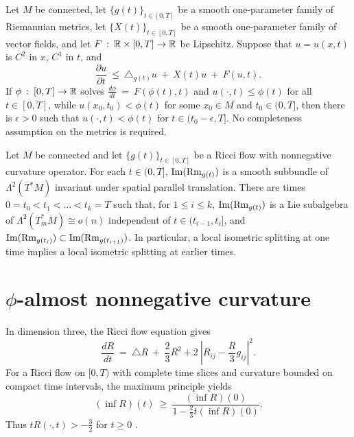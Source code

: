 \begin{theorem}
  \label{thm:kl-maximum-principles-existence-maximum-principles}

Let $M$ be connected, let $\{g(t)\}_{t\in[0,T]}$ be a smooth one-parameter
family of Riemannian metrics, let $\{X(t)\}_{t\in[0,T]}$ be a smooth
one-parameter family of vector fields, and let
$F\: : \:{\mathbb R}\times[0,T]\rightarrow{\mathbb R}$ be Lipschitz. Suppose that $u=u(x,t)$
is $C^2$ in $x$, $C^1$ in $t$, and
\begin{equation}
\frac{\partial u}{\partial t}\: \le \:\triangle_{g(t)}u\:+\:X(t)u\:+\:F(u,t).
\end{equation}
If $\phi\: : \:[0,T]\rightarrow{\mathbb R}$ solves
$\frac{d\phi}{dt}\:=\:F(\phi(t),t)$ and
$u(\cdot,t)\leq\phi(t)$ for all $t\in[0,T]$, while
$u(x_0,t_0)<\phi(t)$ for some $x_0\in M$ and $t_0\in(0,T]$, then there is
$\epsilon>0$ such that $u(\cdot,t)<\phi(t)$ for
$t\in(t_0-\epsilon,T]$.
No completeness assumption on the metrics is required.
\end{theorem}

\begin{theorem}
  \label{thm:kl-maximum-principles-existence-curvature-operators}
 \label{splitting}

Let $M$ be connected and let $\{g(t)\}_{t\in[0,T]}$ be a Ricci flow with
nonnegative curvature operator. For each $t\in(0,T]$,
$\operatorname{Im}(\operatorname{Rm}_{g(t)})$ is a smooth subbundle of $\Lambda^2(T^*M)$ invariant
under spatial parallel translation. There are times
$0=t_0<t_1<\ldots<t_k=T$ such that, for $1\leq i\leq k$,
$\operatorname{Im}(\operatorname{Rm}_{g(t)})$ is a Lie subalgebra of
$\Lambda^2(T^*_mM)\cong o(n)$ independent of $t\in(t_{i-1},t_i]$, and
$\operatorname{Im}(\operatorname{Rm}_{g(t_i)})\subset\operatorname{Im}(\operatorname{Rm}_{g(t_{i+1})})$.
In particular, a local isometric splitting at one time implies a local
isometric splitting at earlier times.
\end{theorem}

\section{$\phi$-almost nonnegative curvature}
\label{phiappendix}

In dimension three, the Ricci flow equation gives
\begin{equation} \label{3dR}
\frac{dR}{dt} \: = \: \triangle R \: + \: \frac{2}{3}R^2
+2\:|R_{ij}-\frac{R}{3}g_{ij}|^2.
\end{equation}
For a Ricci flow on $[0,T)$ with complete time slices and curvature bounded
on compact time intervals, the maximum principle yields
\begin{equation} \label{Rlowerbound}
(\inf R)(t)\: \ge \:
\frac{(\inf R)(0)}{1-\frac23t(\inf R)(0)}.
\end{equation}
Thus $tR(\cdot,t)>-\frac32$ for $t\geq0$ \cite[Section 2]{Hamiltonn}.

